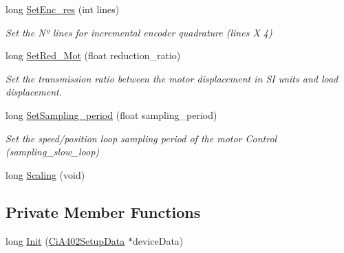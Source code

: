 \begin{DoxyCompactItemize}
long \hyperlink{classCiA402Device_a065607adbfdf2446887554b1a3192243}{Set\+Enc\+\_\+res} (int lines)
\begin{DoxyCompactList}\small\item\em Set the Nº lines for incremental encoder quadrature (lines X 4) \end{DoxyCompactList}\item 
long \hyperlink{classCiA402Device_ad5b57f2ddfc103644daf157dcd6ab34e}{Set\+Red\+\_\+\+Mot} (float reduction\+\_\+ratio)
\begin{DoxyCompactList}\small\item\em Set the transmission ratio between the motor displacement in SI units and load displacement. \end{DoxyCompactList}\item 
long \hyperlink{classCiA402Device_a9fc81b5fd6bec7cf73a1e60b92b7bfc0}{Set\+Sampling\+\_\+period} (float sampling\+\_\+period)
\begin{DoxyCompactList}\small\item\em Set the speed/position loop sampling period of the motor Control (sampling\+\_\+slow\+\_\+loop) \end{DoxyCompactList}\item 
long \hyperlink{classCiA402Device_ae9b30263a0592f0b254ae4f32cd9a765}{Scaling} (void)
\end{DoxyCompactItemize}
\subsection*{Private Member Functions}
\begin{DoxyCompactItemize}
\item 
long \hyperlink{classCiA402Device_abc4e196ca1654a71bc396d77580701f0}{Init} (\hyperlink{classCiA402SetupData}{Ci\+A402\+Setup\+Data} $\ast$device\+Data)
\end{DoxyCompactItemize}
